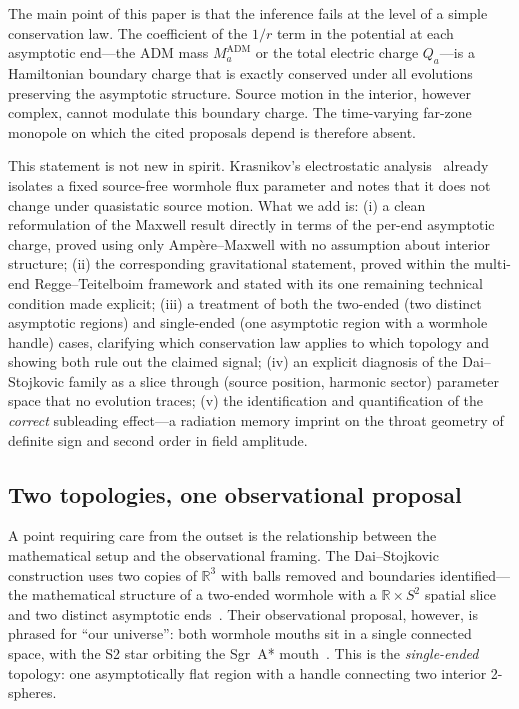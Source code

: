 \documentclass[aps,prd,onecolumn,nofootinbib,superscriptaddress]{revtex4-2}
\begin{document}
The main point of this paper is that the inference fails at the level of a
simple conservation law.  The coefficient of the $1/r$ term in the potential
at each asymptotic end---the ADM mass $M_a^{\mathrm{ADM}}$ or the total
electric charge $Q_a$---is a Hamiltonian boundary charge that is exactly
conserved under all evolutions preserving the asymptotic structure.  Source
motion in the interior, however complex, cannot modulate this boundary charge.
The time-varying far-zone monopole on which the cited proposals depend is
therefore absent.

This statement is not new in spirit.  Krasnikov's electrostatic
analysis~\cite{Krasnikov2008ElectrostaticInteraction,Krasnikov2020CommentObserving}
already isolates a fixed source-free wormhole flux parameter and notes that it
does not change under quasistatic source motion.  What we add is: (i) a clean
reformulation of the Maxwell result directly in terms of the per-end asymptotic
charge, proved using only Amp\`ere--Maxwell with no assumption about interior
structure; (ii) the corresponding gravitational statement, proved within the
multi-end Regge--Teitelboim framework and stated with its one remaining
technical condition made explicit; (iii) a treatment of both the two-ended
(two distinct asymptotic regions) and single-ended (one asymptotic region with
a wormhole handle) cases, clarifying which conservation law applies to which
topology and showing both rule out the claimed signal; (iv) an explicit
diagnosis of the Dai--Stojkovic family as a slice through (source position,
harmonic sector) parameter space that no evolution traces; (v) the
identification and quantification of the \emph{correct} subleading effect---a
radiation memory imprint on the throat geometry of definite sign and second
order in field amplitude.

\subsection*{Two topologies, one observational proposal}

A point requiring care from the outset is the relationship between the
mathematical setup and the observational framing.  The Dai--Stojkovic
construction uses two copies of $\mathbb{R}^3$ with balls removed and
boundaries identified---the mathematical structure of a two-ended wormhole with
a $\mathbb{R}\times S^2$ spatial slice and two distinct asymptotic
ends~\cite{DaiStojkovic2019Observing}.  Their observational proposal, however,
is phrased for ``our universe'': both wormhole mouths sit in a single connected
space, with the S2 star orbiting the Sgr~A* mouth~\cite{DaiStojkovic2019Observing,SimonettiEtAl2021SensitiveSearches}.
This is the \emph{single-ended} topology: one asymptotically flat region with a
handle connecting two interior 2-spheres.
\end{document}
